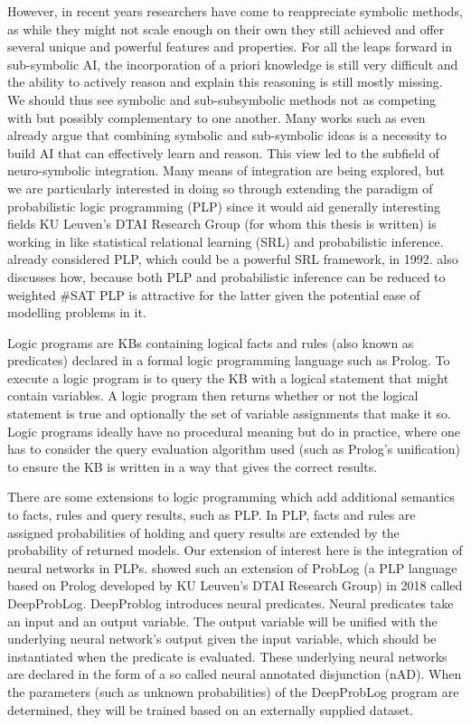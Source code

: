 However, in recent years researchers have come to reappreciate symbolic methods, as while they might not scale enough on their own they still achieved and offer several unique and powerful features and properties. For all the leaps forward in sub-symbolic AI, the incorporation of a priori knowledge is still very difficult and the ability to actively reason and explain this reasoning is still mostly missing. We should thus see symbolic and sub-subsymbolic methods not as competing with but possibly complementary to one another. Many works such as \cite{garcez2015neural} even already argue that combining symbolic and sub-symbolic ideas is a necessity to build AI that can effectively learn and reason. This view led to the subfield of neuro-symbolic integration. Many means of integration are being explored, but we are particularly interested in doing so through extending the paradigm of probabilistic logic programming (PLP) since it would aid generally interesting fields KU Leuven's DTAI Research Group (for whom this thesis is written) is working in like statistical relational learning (SRL) and probabilistic inference. \cite{ng1992probabilistic} already considered PLP, which could be a powerful SRL framework, in 1992. \cite{fierens2015inference} also discusses how, because both PLP and probabilistic inference can be reduced to weighted \#SAT PLP is attractive for the latter given the potential ease of modelling problems in it. \par
Logic programs are KBs containing logical facts and rules (also known as predicates) declared in a formal logic programming language such as Prolog. To execute a logic program is to query the KB with a logical statement that might contain variables. A logic program then returns whether or not the logical statement is true and optionally the set of variable assignments that make it so. Logic programs ideally have no procedural meaning but do in practice, where one has to consider the query evaluation algorithm used (such as Prolog's unification) to ensure the KB is written in a way that gives the correct results. \par
There are some extensions to logic programming which add additional semantics to facts, rules and query results, such as PLP. In PLP, facts and rules are assigned probabilities of holding and query results are extended by the probability of returned models. Our extension of interest here is the integration of neural networks in PLPs. \cite{manhaeve2018deepproblog} showed such an extension of ProbLog (a PLP language based on Prolog developed by KU Leuven's DTAI Research Group) in 2018 called DeepProbLog. DeepProblog introduces neural predicates. Neural predicates take an input and an output variable. The output variable will be unified with the underlying neural network's output given the input variable, which should be instantiated when the predicate is evaluated. These underlying neural networks are declared in the form of a so called neural annotated disjunction (nAD). When the parameters (such as unknown probabilities) of the DeepProbLog program are determined, they will be trained based on an externally supplied dataset. \par
